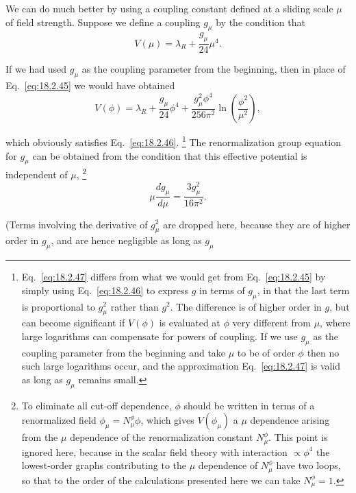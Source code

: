 We can do much better by using a coupling constant defined at a sliding scale
$\mu$ of field strength. Suppose we define a coupling $g_\mu$ by the condition
that
\begin{equation}
V(\mu)=\lambda_R+\frac{g_\mu}{24}\mu^4.
\tag{18.2.46}\label{eq:18.2.46}
\end{equation}
\par\noindent
If we had used $g_\mu$ as the coupling parameter from the beginning, then in
place of Eq.~\eqref{eq:18.2.45} we would have obtained
\begin{equation}
V(\phi)=\lambda_R+\frac{g_\mu}{24}\phi^4
+\frac{g_\mu^2\phi^4}{256\pi^2}\ln\left(\frac{\phi^2}{\mu^2}\right),
\tag{18.2.47}\label{eq:18.2.47}
\end{equation}
\par\noindent
which obviously satisfies Eq.~\eqref{eq:18.2.46}.
\footnote{Eq.~\eqref{eq:18.2.47} differs from what we would get from
Eq.~\eqref{eq:18.2.45} by simply using Eq.~\eqref{eq:18.2.46} to express $g$
in terms of $g_\mu$, in that the last term is proportional to $g_\mu^2$ rather
than $g^2$. The difference is of higher order in $g$, but can become
significant if $V(\phi)$ is evaluated at $\phi$ very different from $\mu$,
where large logarithms can compensate for powers of coupling. If we use
$g_\mu$ as the coupling parameter from the beginning and take $\mu$ to be of
order $\phi$ then no such large logarithms occur, and the approximation
Eq.~\eqref{eq:18.2.47} is valid as long as $g_\mu$ remains small.}
The renormalization group equation for $g_\mu$ can be obtained from the
condition that this effective potential is independent of $\mu$,
\footnote{To eliminate all cut-off dependence, $\phi$ should be written in
terms of a renormalized field $\phi_\mu=N_\mu^\phi\phi$, which gives
$V(\phi_\mu)$ a $\mu$ dependence arising from the $\mu$ dependence of the
renormalization constant $N_\mu^\phi$. This point is ignored here, because in
the scalar field theory with interaction $\propto\phi^4$ the
lowest-order graphs contributing to the $\mu$ dependence of $N_\mu^\phi$ have
two loops, so that to the order of the calculations presented here we can
take $N_\mu^\phi=1$.}
\begin{equation}
\mu\frac{dg_\mu}{d\mu}=\frac{3g_\mu^2}{16\pi^2}.
\tag{18.2.48}\label{eq:18.2.48}
\end{equation}
\par\noindent
(Terms involving the derivative of $g_\mu^2$ are dropped here, because they
are of higher order in $g_\mu$, and are hence negligible as long as $g_\mu$
